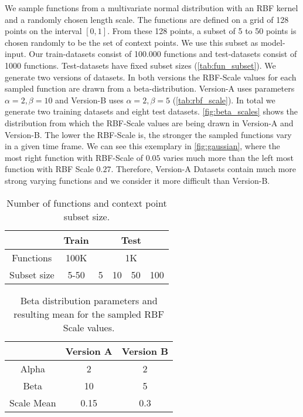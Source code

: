 We sample functions from a multivariate normal distribution with an RBF kernel and a randomly chosen length scale. The functions are defined on a grid of 128 points on the interval $[0,1]$. From these 128 points, a subset of 5 to 50 points is chosen randomly to be the set of context points. We use this subset as model-input. Our train-datasets consist of 100.000 functions and test-datasets consist of 1000 functions. Test-datasets have fixed subset sizes (\autoref{tab:fun_subset}). We generate two versions of datasets. In both versions the RBF-Scale values for each sampled function are drawn from a beta-distribution. Version-A uses parameters $\alpha = 2, \beta = 10$ and Version-B uses $\alpha = 2, \beta = 5$ (\autoref{tab:rbf_scale}). In total we generate two training datasets and eight test datasets. \autoref{fig:beta_scales} shows the distribution from which the RBF-Scale values are being drawn in Version-A and Version-B. The lower the RBF-Scale is, the stronger the sampled functions vary in a given time frame. We can see this exemplary in \autoref{fig:gaussian}, where the most right function with RBF-Scale of $0.05$ varies much more than the left most function with RBF Scale $0.27$. Therefore, Version-A Datasets contain much more strong varying functions and we consider it more difficult than Version-B.

\begin{table}[]
	\centering
	\caption{Number of functions and context point subset size.}
	\begin{tabular}{c c c c c c}
		\toprule
		& Train & \multicolumn{4}{c}{Test}\\
		\midrule
		Functions & 100K & \multicolumn{4}{c}{1K}\\
		Subset size & 5-50 & 5 & 10 & 50 & 100  \\\bottomrule
	\end{tabular}
\label{tab:fun_subset}
\end{table}

\begin{table}[]
	\centering
	\caption{Beta distribution parameters and resulting mean for the sampled RBF Scale values.}
	\begin{tabular}{c c c}
		\toprule
		& Version A & Version B\\
		\midrule
		Alpha & 2 & 2\\
		Beta & 10 & 5  \\\midrule
		Scale Mean & 0.15 & 0.3\\\bottomrule
	\end{tabular}
\label{tab:rbf_scale}
\end{table}


